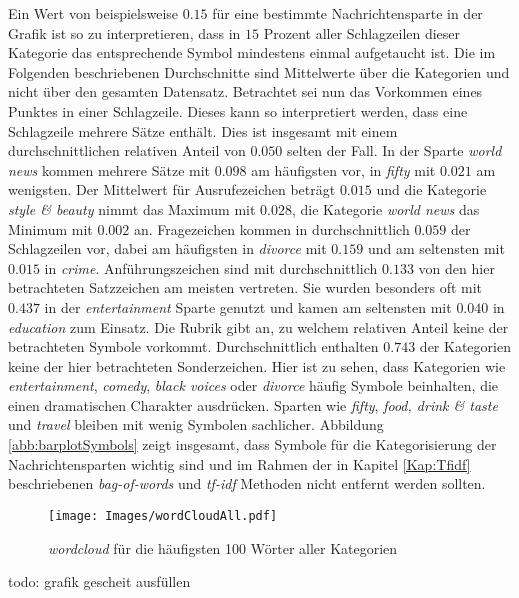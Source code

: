 \documentclass[a4paper,11pt]{article}
\begin{document}
Ein Wert von beispielsweise $0.15$ für eine bestimmte Nachrichtensparte in der Grafik ist so zu interpretieren, dass in $15$ Prozent aller Schlagzeilen dieser Kategorie das entsprechende Symbol mindestens einmal aufgetaucht ist. Die im Folgenden beschriebenen Durchschnitte sind Mittelwerte über die Kategorien und nicht über den gesamten Datensatz. Betrachtet sei nun das Vorkommen eines Punktes in einer Schlagzeile. Dieses kann so interpretiert werden, dass eine Schlagzeile mehrere Sätze enthält. Dies ist insgesamt mit einem durchschnittlichen relativen Anteil von $0.050$ selten der Fall. In der Sparte \textit{world news} kommen mehrere Sätze mit $0.098$ am häufigsten vor, in \textit{fifty} mit $0.021$ am wenigsten. Der Mittelwert für Ausrufezeichen beträgt $0.015$ und die Kategorie \textit{style \& beauty} nimmt das Maximum mit $0.028$, die Kategorie \textit{world news} das Minimum mit $0.002$ an. Fragezeichen kommen in durchschnittlich $0.059$ der Schlagzeilen vor, dabei am häufigsten in \textit{divorce} mit $0.159$ und am seltensten mit $0.015$ in \textit{crime}. Anführungszeichen sind mit durchschnittlich $0.133$ von den hier betrachteten Satzzeichen am meisten vertreten. Sie wurden besonders oft mit $0.437$ in der \textit{entertainment} Sparte genutzt und kamen am seltensten mit $0.040$ in \textit{education} zum Einsatz. Die Rubrik  gibt an, zu welchem relativen Anteil keine der betrachteten Symbole vorkommt. Durchschnittlich enthalten $0.743$ der Kategorien keine der hier betrachteten Sonderzeichen. Hier ist zu sehen, dass Kategorien wie \textit{entertainment}, \textit{comedy}, \textit{black voices} oder \textit{divorce} häufig Symbole beinhalten, die einen dramatischen Charakter ausdrücken. Sparten wie \textit{fifty}, \textit{food, drink \& taste} und \textit{travel} bleiben mit wenig Symbolen sachlicher. Abbildung \ref{abb:barplotSymbols} zeigt insgesamt, dass Symbole für die Kategorisierung der Nachrichtensparten wichtig sind und im Rahmen der in Kapitel \ref{Kap:Tfidf} beschriebenen \textit{bag-of-words} und \textit{tf-idf}  Methoden nicht entfernt werden sollten.

\begin{figure}[ht]
    \centering
\texttt{[image: Images/wordCloudAll.pdf]} 
\caption{\textit{wordcloud} für die häufigsten 100 Wörter aller Kategorien}
\label{abb:WordcloudAll}
\end{figure}
todo: grafik gescheit ausfüllen
\end{document}
